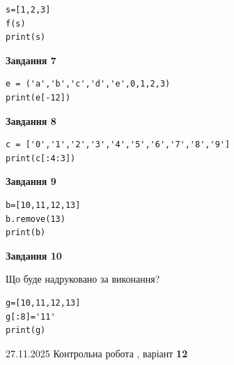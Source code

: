 \documentclass[12pt, ukrainian]{article}
\begin{document}
{{{{{{{{{{{{\begin{minipage}[t]{10.5cm}
\begin{verbatim}
s=[1,2,3]
f(s)
print(s)
\end{verbatim}



\begin{center}
\textbf{Завдання 7}
\end{center}

\begin{verbatim}
e = ('a','b','c','d','e',0,1,2,3)
print(e[-12])
\end{verbatim}



\begin{center}
\textbf{Завдання 8}
\end{center}

\begin{verbatim}
c = ['0','1','2','3','4','5','6','7','8','9']
print(c[:4:3])
\end{verbatim}



\begin{center}
\textbf{Завдання 9}
\end{center}

\begin{verbatim}
b=[10,11,12,13]
b.remove(13)
print(b)
\end{verbatim}



\begin{center}
\textbf{Завдання 10}
\end{center}
Що буде надруковано за виконання?\par
\begin{verbatim}
g=[10,11,12,13]
g[:8]='11'
print(g)
\end{verbatim}

\end{minipage}

}
\newpage

{{ 27.11.2025 Контрольна робота , варіант  \No \textbf { 12 }\par}}
{

{%



}}}}}}}}}}}}}
\end{document}
